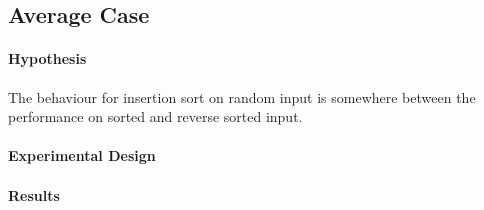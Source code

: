 \documentclass[a4]{article}
\begin{document}




\subsection{Average Case}

\paragraph{Hypothesis} The behaviour for insertion sort on random input is somewhere between the performance on sorted and reverse sorted input.  


\paragraph{Experimental Design} 









\paragraph{Results} 
\end{document}
